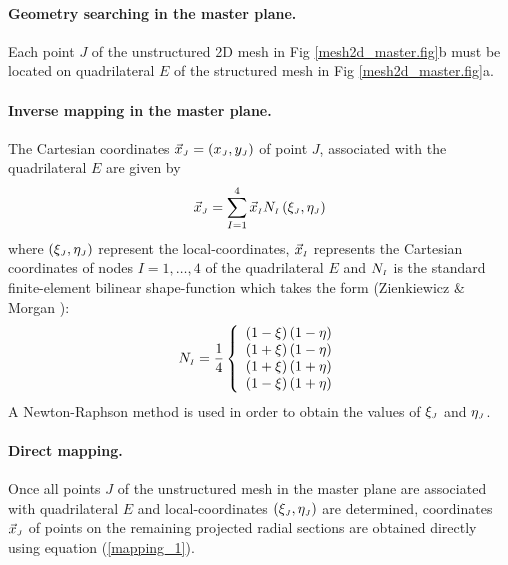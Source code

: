\paragraph{\bf Geometry searching in the master plane.}
 Each point $J$ of the unstructured 2D mesh in Fig \ref{mesh2d_master.fig}b
 must be located on quadrilateral $E$ of the structured mesh in
 Fig \ref{mesh2d_master.fig}a.
%
 \paragraph{\bf Inverse mapping in the master plane.}
 The Cartesian coordinates
 $\vec{x}_{\mbox{\tiny $J$}} = \left(x_{\mbox{\tiny $J$}}, y_{\mbox{\tiny $J$}}\right)$ of point $J$,
 associated with the quadrilateral $E$ are given by
%
\begin{equation}
  \vec{x}_{\mbox{\tiny $J$}} = \sum_{I=1}^4 \vec{x}_{\mbox{\tiny $I$}}
                   N_{\mbox{\tiny $I$}} \left(\xi_{\mbox{\tiny $J$}},\eta_{\mbox{\tiny $J$}}\right)
  \label{mapping_1}
\end{equation}
%
 where $\left(\xi_{\mbox{\tiny $J$}},\eta_{\mbox{\tiny $J$}}\right)$ represent the local-coordinates,
 $\vec{x}_{\mbox{\tiny $I$}}$ represents the Cartesian coordinates of nodes $I=1,\dots,4$
 of the quadrilateral $E$ and
 $N_{\mbox{\tiny $I$}}$ is the standard finite-element bilinear shape-function
 which takes the form (Zienkiewicz \& Morgan ):
%
\begin{equation}
  N_{\mbox{\tiny $I$}} = \frac{1}{4} \left\{
  \begin{array}{l}
     \left(1 - \xi\right) \left(1 - \eta\right) \\
     \left(1 + \xi\right) \left(1 - \eta\right) \\
     \left(1 + \xi\right) \left(1 + \eta\right) \\
     \left(1 - \xi\right) \left(1 + \eta\right)
  \end{array}
  \right.
  \label{shape_function}
\end{equation}
%
 A Newton-Raphson method is used in order to obtain the values of
 $\xi_{\mbox{\tiny $J$}}$ and $\eta_{\mbox{\tiny $J$}}$.
%
 \paragraph{\bf Direct mapping.}
 Once all points $J$ of the
 unstructured mesh in the master plane are associated with quadrilateral
 $E$ and local-coordinates $\left(\xi_{\mbox{\tiny $J$}},\eta_{\mbox{\tiny $J$}}\right)$
 are determined, coordinates $\vec{x}_{\mbox{\tiny $J$}}$ of points
 on the remaining projected radial sections are obtained
 directly using equation (\ref{mapping_1}).
\vspace{5mm}

